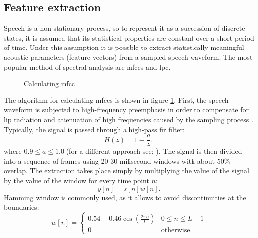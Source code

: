 \subsection{Feature extraction}
\label{subsection:features}
Speech is a non-stationary process, so to represent it as a succession of discrete states, it is assumed that its statistical properties are constant over a short period of time. Under this assumption it is possible to extract statistically meaningful acoustic parameters (feature vectors) from a sampled speech waveform. The most popular method of spectral analysis are \glspl{mfcc} and \gls{lpc}.

\begin{figure}[!ht]
  \centering
    \caption{Calculating \gls{mfcc}}
    \label{figure:mfcc}
\end{figure}
The algorithm for calculating \glspl{mfcc} is shown in figure \ref{figure:mfcc}. First, the speech waveform is subjected to high-frequency preemphasis in order to compensate for lip radiation and attenuation of high frequencies caused by the sampling process \cite{singh2012preprocessing}. Typically, the signal is passed through a high-pass \gls{fir} filter:
\begin{equation}
H(z)=1-\frac{a}{z},
\end{equation}
where $0.9 \leq a \leq 1.0$ (for a different approach see: \cite{nossair1995signal}). The signal is then divided into a sequence of frames using 20-30 milisecond windows with about 50\% overlap. The extraction takes place simply by multiplying the value of the signal by the value of the window for every time point $n$:
\begin{equation}
  y[n]=s[n]w[n].
\end{equation}
Hamming window is commonly used, as it allows to avoid discontinuities at the boundaries:
\begin{equation}
\label{equation:hamming}
  w[n]=
  \begin{cases}
    0.54-0.46\cos(\frac{2 \pi n}{L}) & 0 \leq n \leq L-1 \\
    0                               & \text{otherwise.}
  \end{cases}
\end{equation}

